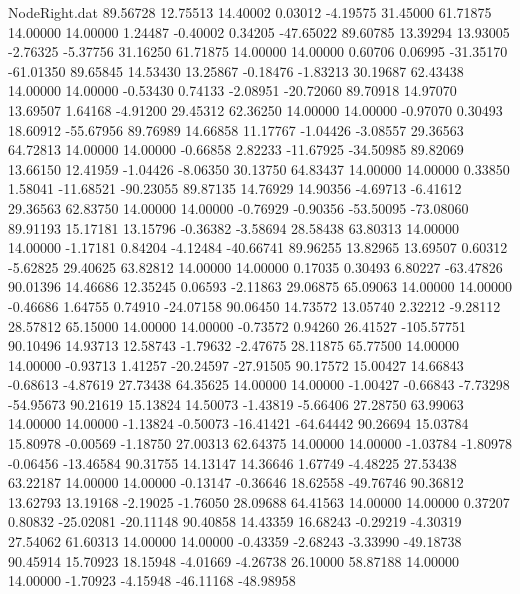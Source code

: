 \begin{filecontents}{NodeRight.dat}
  89.56728   12.75513   14.40002     0.03012   -4.19575   31.45000   61.71875   14.00000   14.00000    1.24487   -0.40002    0.34205  -47.65022
  89.60785   13.39294   13.93005    -2.76325   -5.37756   31.16250   61.71875   14.00000   14.00000    0.60706    0.06995  -31.35170  -61.01350
  89.65845   14.53430   13.25867    -0.18476   -1.83213   30.19687   62.43438   14.00000   14.00000   -0.53430    0.74133   -2.08951  -20.72060
  89.70918   14.97070   13.69507     1.64168   -4.91200   29.45312   62.36250   14.00000   14.00000   -0.97070    0.30493   18.60912  -55.67956
  89.76989   14.66858   11.17767    -1.04426   -3.08557   29.36563   64.72813   14.00000   14.00000   -0.66858    2.82233  -11.67925  -34.50985
  89.82069   13.66150   12.41959    -1.04426   -8.06350   30.13750   64.83437   14.00000   14.00000    0.33850    1.58041  -11.68521  -90.23055
  89.87135   14.76929   14.90356    -4.69713   -6.41612   29.36563   62.83750   14.00000   14.00000   -0.76929   -0.90356  -53.50095  -73.08060
  89.91193   15.17181   13.15796    -0.36382   -3.58694   28.58438   63.80313   14.00000   14.00000   -1.17181    0.84204   -4.12484  -40.66741
  89.96255   13.82965   13.69507     0.60312   -5.62825   29.40625   63.82812   14.00000   14.00000    0.17035    0.30493    6.80227  -63.47826
  90.01396   14.46686   12.35245     0.06593   -2.11863   29.06875   65.09063   14.00000   14.00000   -0.46686    1.64755    0.74910  -24.07158
  90.06450   14.73572   13.05740     2.32212   -9.28112   28.57812   65.15000   14.00000   14.00000   -0.73572    0.94260   26.41527 -105.57751
  90.10496   14.93713   12.58743    -1.79632   -2.47675   28.11875   65.77500   14.00000   14.00000   -0.93713    1.41257  -20.24597  -27.91505
  90.17572   15.00427   14.66843    -0.68613   -4.87619   27.73438   64.35625   14.00000   14.00000   -1.00427   -0.66843   -7.73298  -54.95673
  90.21619   15.13824   14.50073    -1.43819   -5.66406   27.28750   63.99063   14.00000   14.00000   -1.13824   -0.50073  -16.41421  -64.64442
  90.26694   15.03784   15.80978    -0.00569   -1.18750   27.00313   62.64375   14.00000   14.00000   -1.03784   -1.80978   -0.06456  -13.46584
  90.31755   14.13147   14.36646     1.67749   -4.48225   27.53438   63.22187   14.00000   14.00000   -0.13147   -0.36646   18.62558  -49.76746
  90.36812   13.62793   13.19168    -2.19025   -1.76050   28.09688   64.41563   14.00000   14.00000    0.37207    0.80832  -25.02081  -20.11148
  90.40858   14.43359   16.68243    -0.29219   -4.30319   27.54062   61.60313   14.00000   14.00000   -0.43359   -2.68243   -3.33990  -49.18738
  90.45914   15.70923   18.15948    -4.01669   -4.26738   26.10000   58.87188   14.00000   14.00000   -1.70923   -4.15948  -46.11168  -48.98958

\end{filecontents}
